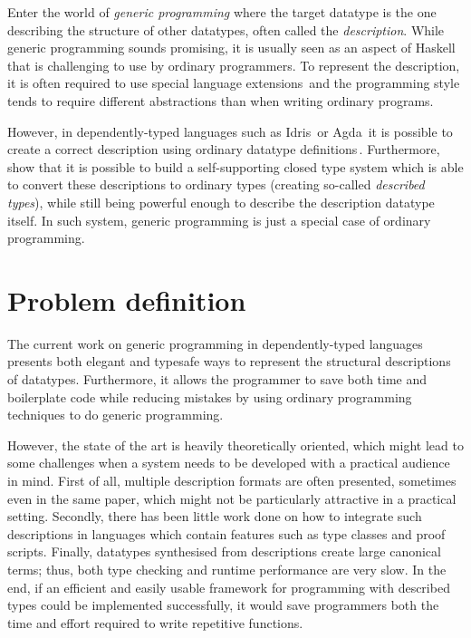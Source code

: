 \documentclass{ituthesis}
\theoremstyle{break}
\begin{document}
Enter the world of \textit{generic programming} where the target datatype is the one describing the structure of other datatypes, often called the \textit{description}\label{kw:desc}.
While generic programming sounds promising, it is usually seen as an aspect of Haskell\,\autocite{haskell98} that is challenging to use by ordinary programmers. To represent the description, it is often required to use special language extensions\,\autocite{magalhaes2010generic,Jansson:1997:PPP:263699.263763} and the programming style tends to require different abstractions than when writing ordinary programs.

However, in dependently-typed languages such as Idris\,\autocite{brady2013idris} or Agda\,\autocite{norell2009dependently} it is possible to create a correct description using ordinary datatype definitions\,\autocite{benke2003universes}.
Furthermore, \textcite{Chapman:2010:GAL:1863543.1863547} show that it is possible to build a self-supporting closed type system which is able to convert these descriptions to ordinary types (creating so-called \textit{described types}), while still being powerful enough to describe the description datatype itself.
In such system, generic programming is just a special case of ordinary programming.



\section{Problem definition}
\label{sec:ProblemDefinition}
The current work on generic programming in dependently-typed languages presents both elegant and typesafe ways to represent the structural descriptions of datatypes.
Furthermore, it allows the programmer to save both time and boilerplate code while reducing mistakes by using ordinary programming techniques to do generic programming.

However, the state of the art is heavily theoretically oriented, which might lead to some challenges when a system needs to be developed with a practical audience in mind.
First of all, multiple description formats are often presented, sometimes even in the same paper, which might not be particularly attractive in a practical setting.
Secondly, there has been little work done on how to integrate such descriptions in languages which contain features such as type classes and proof scripts.
Finally, datatypes synthesised from descriptions create large canonical terms; thus, both type checking and runtime performance are very slow.
In the end, if an efficient and easily usable framework for programming with described types could be implemented successfully, it would save programmers both the time and effort required to write repetitive functions.
\end{document}
